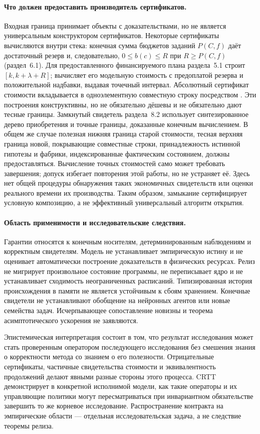 \paragraph{Что должен предоставить производитель сертификатов.}
Входная граница принимает объекты с доказательствами, но не является универсальным конструктором сертификатов. Некоторые сертификаты вычисляются внутри стека: конечная сумма бюджетов заданий $P(C,f)$ даёт достаточный резерв и, следовательно, $0\le b(c)\le R$ при $R\ge P(C,f)$ (раздел~6.1). Для предоставленного финансируемого плана раздела~5.1  строит $[k,k+\lambda+R]$;  вычисляет его модельную стоимость с предоплатой резерва и положительной надбавки, выдавая точечный интервал. Абсолютный сертификат стоимости вкладывается в одноэлементную совместную строку посредством . Эти построения конструктивны, но не обязательно дёшевы и не обязательно дают тесные границы. Замкнутый свидетель раздела~8.2 использует синтезированное дерево приобретения и точные границы, доказанные конечным вычислением. В общем же случае полезная нижняя граница старой стоимости, тесная верхняя граница новой, покрывающие совместные строки, принадлежность истинной гипотезы и фабрики, индексированные фактическим состоянием, должны предоставляться. Вычисление точных стоимостей само может требовать завершения; допуск избегает повторения этой работы, но не устраняет её. Здесь нет общей процедуры обнаружения таких экономичных свидетельств или оценки реального времени их производства. Таким образом, замыкание сертифицирует условную композицию, а не эффективный универсальный алгоритм открытия.

\paragraph{Область применимости и исследовательские следствия.}
Гарантии относятся к конечным носителям, детерминированным наблюдениям и корректным свидетелям. Модель не устанавливает эмпирическую истину и не оценивает автоматически построение доказательств в физических ресурсах. Релиз не мигрирует произвольное состояние программы, не переписывает ядро и не устанавливает сходимость неограниченных расписаний. Типизированная история происхождения в памяти не является устойчивым к сбоям хранением. Конечные свидетели не устанавливают обобщение на нейронных агентов или новые семейства задач. Исчерпывающее сопоставление новизны и теорема асимптотического ускорения не заявляются.

Эпистемическая интерпретация состоит в том, что результат исследования может стать проверенным оператором последующего исследования без смешения знания о корректности метода со знанием о его полезности. Отрицательные сертификаты, частичные свидетельства стоимости и эквивалентность продолжений делают явными разные стороны этого процесса. CRTT демонстрирует в конкретной исполнимой модели, как такие операторы и их управляющие политики могут пересматриваться при инвариантном обязательстве завершить то же корневое исследование. Распространение контракта на эмпирические области --- отдельная исследовательская задача, а не следствие теоремы релиза.
